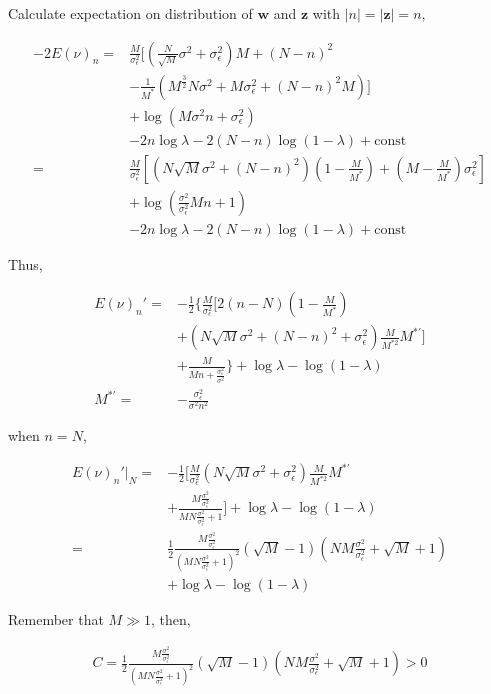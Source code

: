 \documentclass[notitlepage]{article}
\begin{document}
Calculate expectation on distribution of $\bm{w}$ and $\bm{z}$ with $|n|=|\bm{z}|=n$, 

\begin{align}
    -2E(\nu)_n =& \frac{M}{\sigma_\epsilon^2}[(\frac{N}{\sqrt{M}}\sigma^2+\sigma_\epsilon^2)M+(N-n)^2 \\
    &-\frac{1}{M^\ast}(M^{\frac{3}{2}}N\sigma^2+M\sigma_\epsilon^2+(N-n)^2 M)] \\
    &+ \log(M\sigma^2n+\sigma_\epsilon^2) \\
    &- 2n\log\lambda - 2(N-n)\log(1-\lambda) + \mathrm{const} \\
    =& \frac{M}{\sigma_\epsilon^2}[(N\sqrt{M}\sigma^2+(N-n)^2)(1-\frac{M}{M^\ast})+(M-\frac{M}{M^\ast})\sigma_\epsilon^2] \\
    &+ \log(\frac{\sigma^2}{\sigma_\epsilon^2}Mn+1) \\
    &- 2n\log\lambda - 2(N-n)\log(1-\lambda) + \mathrm{const}
\end{align}

Thus, 

\begin{align}
    E(\nu)_n' =& -\frac{1}{2}\{\frac{M}{\sigma_\epsilon^2}[2(n-N)(1-\frac{M}{M^\ast}) \\
    &+(N\sqrt{M}\sigma^2+(N-n)^2+\sigma_\epsilon^2)\frac{M}{M^{\ast2}}M^{\ast'}] \\
    &+\frac{M}{Mn+\frac{\sigma_\epsilon^2}{\sigma^2}}\} + \log\lambda - \log(1-\lambda) \\
    M^{\ast'} =& -\frac{\sigma_\epsilon^2}{\sigma^2n^2}
\end{align}

when $n=N$,

\begin{align}
    E(\nu)_n'|_N =& -\frac{1}{2}[\frac{M}{\sigma_\epsilon^2}(N\sqrt{M}\sigma^2+\sigma_\epsilon^2)\frac{M}{M^{\ast2}}M^{\ast'} \\
    &+\frac{M\frac{\sigma^2}{\sigma_\epsilon^2}}{MN\frac{\sigma^2}{\sigma_\epsilon^2}+1}] + \log\lambda - \log(1-\lambda) \\
    =& \frac{1}{2}\frac{M\frac{\sigma^2}{\sigma_\epsilon^2}}{(MN\frac{\sigma^2}{\sigma_\epsilon^2}+1)^2}(\sqrt{M}-1)(NM\frac{\sigma^2}{\sigma_\epsilon^2}+\sqrt{M}+1) \\
    &+ \log\lambda - \log(1-\lambda)
\end{align}

Remember that $M \gg 1$, then,

\begin{align}
    C = \frac{1}{2}\frac{M\frac{\sigma^2}{\sigma_\epsilon^2}}{(MN\frac{\sigma^2}{\sigma_\epsilon^2}+1)^2}(\sqrt{M}-1)(NM\frac{\sigma^2}{\sigma_\epsilon^2}+\sqrt{M}+1) > 0
\end{align}
\end{document}

